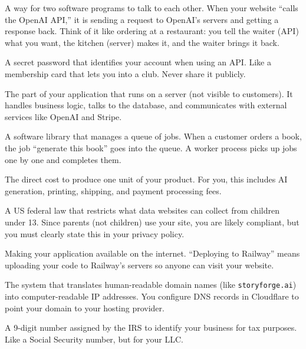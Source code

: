 \documentclass[12pt, letterpaper, oneside]{book}
\begin{document}
\begin{description}[style=nextline, leftmargin=2em, itemsep=6pt]

\item[API (Application Programming Interface)]
A way for two software programs to talk to each other. When your website ``calls the OpenAI API,'' it is sending a request to OpenAI's servers and getting a response back. Think of it like ordering at a restaurant: you tell the waiter (API) what you want, the kitchen (server) makes it, and the waiter brings it back.

\item[API Key]
A secret password that identifies your account when using an API. Like a membership card that lets you into a club. Never share it publicly.

\item[Backend]
The part of your application that runs on a server (not visible to customers). It handles business logic, talks to the database, and communicates with external services like OpenAI and Stripe.

\item[BullMQ]
A software library that manages a queue of jobs. When a customer orders a book, the job ``generate this book'' goes into the queue. A worker process picks up jobs one by one and completes them.

\item[COGS (Cost of Goods Sold)]
The direct cost to produce one unit of your product. For you, this includes AI generation, printing, shipping, and payment processing fees.

\item[COPPA (Children's Online Privacy Protection Act)]
A US federal law that restricts what data websites can collect from children under 13. Since parents (not children) use your site, you are likely compliant, but you must clearly state this in your privacy policy.

\item[Deploy / Deployment]
Making your application available on the internet. ``Deploying to Railway'' means uploading your code to Railway's servers so anyone can visit your website.

\item[DNS (Domain Name System)]
The system that translates human-readable domain names (like \texttt{storyforge.ai}) into computer-readable IP addresses. You configure DNS records in Cloudflare to point your domain to your hosting provider.

\item[EIN (Employer Identification Number)]
A 9-digit number assigned by the IRS to identify your business for tax purposes. Like a Social Security number, but for your LLC.


\end{description}
\end{document}
